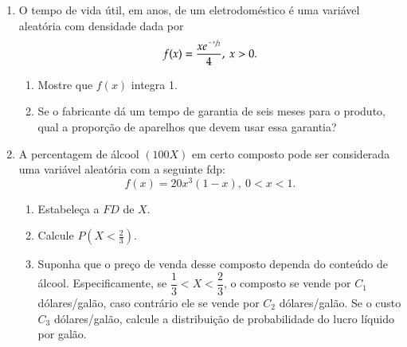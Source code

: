 \begin{enumerate}
\begin{enumerate}[label=\alph*)]
	\end{enumerate}
	
\item O tempo de vida útil, em anos, de um eletrodoméstico é uma variável aleatória com densidade dada por
	\begin{equation*}
		f(x)=\dfrac{xe^{\sfrac{-x}{2}}}{4},\ x>0.
	\end{equation*}
	
	\begin{enumerate}[label=\alph*)]
		\item Mostre que $f(x)$ integra 1.
		
		\item Se o fabricante dá um tempo de garantia de seis meses para o produto, qual a proporção de aparelhos que devem usar essa garantia?
	\end{enumerate}
	
\setcounter{enumi}{3}
\item A percentagem de álcool $(100X)$ em certo composto pode ser considerada uma variável aleatória com a seguinte fdp:
	\begin{equation*}
		f(x) = 20x^{3}(1-x),\ 0 < x < 1.
	\end{equation*}

	\begin{enumerate}[label=\alph*)]
		\item Estabeleça a $FD$ de $X$.
		
		\item Calcule $P\left(X < \frac{2}{3}\right)$.
		
		
		\item Suponha que o preço de venda desse composto dependa do conteúdo de álcool. Especificamente, se $\dfrac{1}{3} < X < \dfrac{2}{3}$, o composto se vende por $C_{1}$ dólares/galão, caso contrário ele se vende por $C_{2}$ dólares/galão. Se o custo $C_{3}$ dólares/galão, calcule a distribuição de probabilidade do lucro líquido por galão.
		

\end{enumerate}
\end{enumerate}
